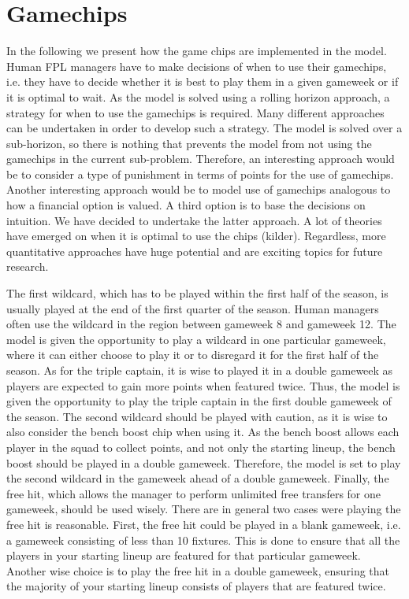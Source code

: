 \newpage
\section{Gamechips}\label{Ch.5_Game_chips}
In the following we present how the game chips are implemented in the model. Human FPL managers have to make decisions of when to use their gamechips, i.e. they have to decide whether it is best to play them in a given gameweek or if it is optimal to wait. As the model is solved using a rolling horizon approach, a strategy for when to use the gamechips is required. Many different approaches can be undertaken in order to develop such a strategy. The model is solved over a sub-horizon, so there is nothing that prevents the model from not using the gamechips in the current sub-problem. Therefore, an interesting approach would be to consider a type of punishment in terms of points for the use of gamechips. Another interesting approach would be to model use of gamechips analogous to how a financial option is valued. A third option is to base the decisions on intuition. We have decided to undertake the latter approach. A lot of theories have emerged on when it is optimal to use the chips (kilder). Regardless, more quantitative approaches have huge potential and are exciting topics for future research.

\newpar
The first wildcard, which has to be played within the first half of the season, is usually played at the end of the first quarter of the season. Human managers often use the wildcard in the region between gameweek 8 and gameweek 12. The model is given the opportunity to play a wildcard in one particular gameweek, where it can either choose to play it or to disregard it for the first half of the season. 
\newpar
As for the triple captain, it is wise to played it in a double gameweek as players are expected to gain more points when featured twice. Thus, the model is given the opportunity to play the triple captain in the first double gameweek of the season. 
\newpar
The second wildcard should be played with caution, as it is wise to also consider the bench boost chip when using it. As the bench boost allows each player in the squad to collect points, and not only the starting lineup, the bench boost should be played in a double gameweek. Therefore, the model is set to play the second wildcard in the gameweek ahead of a double gameweek.
\newpar
Finally, the free hit, which allows the manager to perform unlimited free transfers for one gameweek, should be used wisely. There are in general two cases were playing the free hit is reasonable. First, the free hit could be played in a blank gameweek, i.e. a gameweek consisting of less than 10 fixtures. This is done to ensure that all the players in your starting lineup are featured for that particular gameweek. Another wise choice is to play the free hit in a double gameweek, ensuring that the majority of your starting lineup consists of players that are featured twice. 





